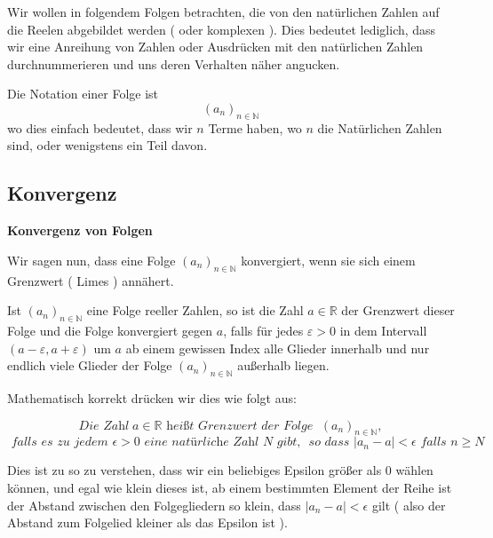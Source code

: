 \documentclass[headsepline,12pt,a4paper]{scrartcl}
\begin{document}
Wir wollen in folgendem Folgen betrachten, die von den natürlichen Zahlen auf die Reelen abgebildet werden ( oder komplexen ). Dies bedeutet lediglich, dass wir eine Anreihung von Zahlen oder Ausdrücken mit den natürlichen Zahlen durchnummerieren und uns deren Verhalten näher angucken.\\

\item Die Notation einer Folge ist $$ (a_n)_{n \in \mathbb{N}} $$ 
wo dies einfach bedeutet, dass wir $n$ Terme haben, wo $n$ die Natürlichen Zahlen sind, oder wenigstens ein Teil davon. \\

\newpage

\subsection*{Konvergenz}

\begin{center}
\item[\textbf{Konvergenz von Folgen}]
\end{center}
\item Wir sagen nun, dass eine Folge $ (a_n)_{n \in \mathbb{N}} $ konvergiert, wenn sie sich einem Grenzwert ( Limes ) annähert.\\

\item  Ist  ${\displaystyle (a_{n})_{n\in \mathbb {N} }}  $ eine Folge reeller Zahlen, so ist die Zahl ${\displaystyle a\in \mathbb {R} }  $  der Grenzwert dieser Folge und die Folge konvergiert gegen $a$, falls für jedes ${\displaystyle \varepsilon >0} $  in dem Intervall ${\displaystyle (a-\varepsilon ,a+\varepsilon )} $ um ${\displaystyle a} $ ab einem gewissen Index alle Glieder innerhalb und nur endlich viele Glieder der Folge ${\displaystyle (a_{n})_{n\in \mathbb {N} }} $ außerhalb liegen. \\

\item Mathematisch korrekt drücken wir dies wie folgt aus: 

$$ \textit{Die Zahl} \; a \in \mathbb{R} \textit{ heißt Grenzwert der Folge } \;  (a_n)_{n \in \mathbb{N}}, $$
$$  \textit{ falls es zu jedem } \epsilon > 0  \textit{ eine natürliche Zahl N gibt, $$
$$ so dass } |a_n -a | < \epsilon \textit{ falls } n \geq N $$

\item Dies ist zu so zu verstehen, dass wir ein beliebiges Epsilon größer als 0 wählen können, und egal wie klein dieses ist, ab einem bestimmten Element der Reihe ist der Abstand zwischen den Folgegliedern so klein, dass $ |a_n -a | < \epsilon $ gilt ( also der Abstand zum Folgelied kleiner als das Epsilon ist ). \\
\end{document}

